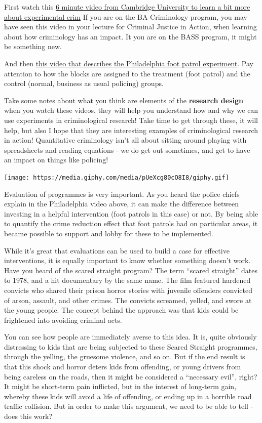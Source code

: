 \documentclass[
]{book}
\begin{document}
First watch this \href{https://www.youtube.com/watch?v=IGDF1-B1Yjs\&feature=player_embedded}{6 minute video from Cambridge University to learn a bit more about experimental crim} If you are on the BA Criminology program, you may have seen this video in your lecture for Criminal Justice in Action, when learning about how criminology has an impact. It you are on the BASS program, it might be something new.

And then \href{https://www.youtube.com/watch?v=0NUQsK0vnnM}{this video that describes the Philadelphia foot patrol experiment}. Pay attention to how the blocks are assigned to the treatment (foot patrol) and the control (normal, business as usual policing) groups.

Take some notes about what you think are elements of the \textbf{research design} when you watch these videos, they will help you understand how and why we can use experiments in criminological research! Take time to get through these, it will help, but also I hope that they are interesting examples of criminological research in action! Quantitative criminology isn't all about sitting around playing with spreadsheets and reading equations - we do get out sometimes, and get to have an impact on things like policing!

\texttt{[image: https://media.giphy.com/media/pUeXcg80cO8I8/giphy.gif]}

Evaluation of programmes is very important. As you heard the police chiefs explain in the Philadelphia video above, it can make the difference between investing in a helpful intervention (foot patrols in this case) or not. By being able to quantify the crime reduction effect that foot patrols had on particular areas, it became possible to support and lobby for these to be implemented.

While it's great that evaluations can be used to build a case for effective interventions, it is equally important to know whether something doesn't work. Have you heard of the scared straight program? The term ``scared straight'' dates to 1978, and a hit documentary by the same name. The film featured hardened convicts who shared their prison horror stories with juvenile offenders convicted of arson, assault, and other crimes. The convicts screamed, yelled, and swore at the young people. The concept behind the approach was that kids could be frightened into avoiding criminal acts.

You can see how people are immediately averse to this idea. It is, quite obviously distressing to kids that are being subjected to these Scared Straight programmes, through the yelling, the gruesome violence, and so on. But if the end result is that this shock and horror deters kids from offending, or young drivers from being careless on the roads, then it might be considered a ``necessary evil'', right? It might be short-term pain inflicted, but in the interest of long-term gain, whereby these kids will avoid a life of offending, or ending up in a horrible road traffic collision. But in order to make this argument, we need to be able to tell - does this work?
\end{document}
